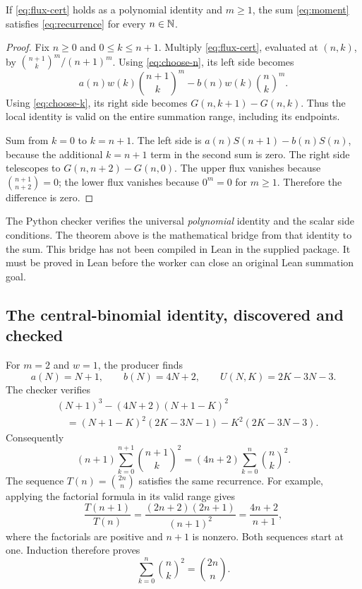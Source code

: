 \begin{theorem}
If \eqref{eq:flux-cert} holds as a polynomial identity and $m\ge1$, the sum \eqref{eq:moment} satisfies \eqref{eq:recurrence} for every $n\in\mathbb N$.
\end{theorem}
\begin{proof}
Fix $n\ge0$ and $0\le k\le n+1$. Multiply \eqref{eq:flux-cert}, evaluated at $(n,k)$, by $\binom{n+1}k^m/(n+1)^m$. Using \eqref{eq:choose-n}, its left side becomes
\[
 a(n)w(k)\binom{n+1}k^m-b(n)w(k)\binom nk^m.
\]
Using \eqref{eq:choose-k}, its right side becomes $G(n,k+1)-G(n,k)$. Thus the local identity is valid on the entire summation range, including its endpoints.

Sum from $k=0$ to $k=n+1$. The left side is $a(n)S(n+1)-b(n)S(n)$, because the additional $k=n+1$ term in the second sum is zero. The right side telescopes to $G(n,n+2)-G(n,0)$. The upper flux vanishes because $\binom{n+1}{n+2}=0$; the lower flux vanishes because $0^m=0$ for $m\ge1$. Therefore the difference is zero.
\end{proof}

The Python checker verifies the universal \emph{polynomial} identity and the scalar side conditions. The theorem above is the mathematical bridge from that identity to the sum. This bridge has not been compiled in Lean in the supplied package. It must be proved in Lean before the worker can close an original Lean summation goal.

\subsection{The central-binomial identity, discovered and checked}

For $m=2$ and $w=1$, the producer finds
\[
 a(N)=N+1,\qquad b(N)=4N+2,\qquad U(N,K)=2K-3N-3.
\]
The checker verifies
\begin{align*}
 &(N+1)^3-(4N+2)(N+1-K)^2\\
 &\quad=(N+1-K)^2(2K-3N-1)-K^2(2K-3N-3).
\end{align*}
Consequently
\[
 (n+1)\sum_{k=0}^{n+1}\binom{n+1}k^2
 =(4n+2)\sum_{k=0}^n\binom nk^2.
\]
The sequence $T(n)=\binom{2n}n$ satisfies the same recurrence. For example, applying the factorial formula in its valid range gives
\[
 \frac{T(n+1)}{T(n)}
 =\frac{(2n+2)(2n+1)}{(n+1)^2}
 =\frac{4n+2}{n+1},
\]
where the factorials are positive and $n+1$ is nonzero. Both sequences start at one. Induction therefore proves
\begin{equation}
 \boxed{\displaystyle\sum_{k=0}^n\binom nk^2=\binom{2n}n.}
 \label{eq:vandermonde}
\end{equation}

